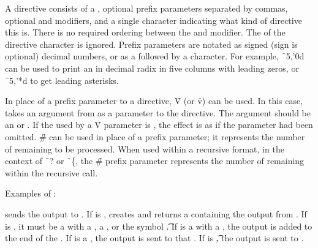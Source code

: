 A directive consists of a ,
optional prefix parameters
separated by commas, optional  and  modifiers,
and a single character indicating what kind of directive this is.
There is no required ordering between the  and  modifier.
The  of the directive character is ignored.
Prefix parameters are notated as signed (sign is optional) decimal numbers,
or as a  followed by a character.
For example, \f{~5,'0d} can be used
to print an  
in decimal radix in five columns with leading zeros,
or \f{~5,'*d} to get leading asterisks.

In place of a prefix parameter to a directive, \f{V} (or \f{v}) can be used. 
In this case,  takes an argument from  as a parameter to
the directive.  The argument should be an  or .
If the  used by a \f{V} parameter is \nil,
the effect is as if the parameter had been omitted.
\f{\#} can be used in place of a prefix parameter; it
represents the number of  remaining to be processed.
When used within a recursive format, in the context of \f{~?} or \f{~\{},
the \f{\#} prefix parameter represents the number of 
remaining within the recursive call.

Examples of :


 sends the output to .
If  is \nil,
 creates and returns a  
containing the output from .
If  is , 
it must be a  with a , 
a , or the symbol \t.
If  is a  with a , 
the output is added to the end of the . 
If  is a , 
the output is sent to that . 
If  is \t,
the output is sent to .

